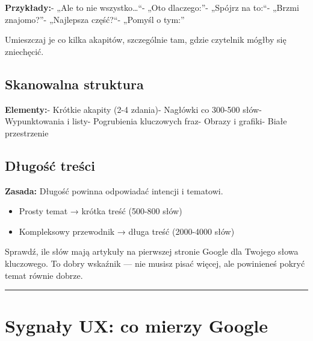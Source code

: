 \documentclass[
  12pt,
  a4paper,
  twoside,
  openright,
  12pt,
  DIV=12,
  BCOR=12mm]{scrbook}
\providecommand{\tightlist}{%
  \setlength{\itemsep}{0pt}\setlength{\parskip}{0pt}}\usepackage{longtable,booktabs,array}
\newcommand{\decoline}{%
  \begin{center}
    \textcolor{bordergray}{\rule{0.3\textwidth}{0.5pt}}
  \end{center}
}
\begin{document}
\textbf{Przykłady:}\newline - „Ale to nie wszystko\ldots{}``\newline -
„Oto dlaczego:''\newline - „Spójrz na to:``\newline - „Brzmi
znajomo?''\newline - „Najlepsza część?``\newline - „Pomyśl o tym:''

Umieszczaj je co kilka akapitów, szczególnie tam, gdzie czytelnik mógłby
się zniechęcić.

\subsection{Skanowalna struktura}\label{skanowalna-struktura}

\textbf{Elementy:}\newline - Krótkie akapity (2-4 zdania)\newline -
Nagłówki co 300-500 słów\newline - Wypunktowania i listy\newline -
Pogrubienia kluczowych fraz\newline - Obrazy i grafiki\newline - Białe
przestrzenie

\subsection{Długość treści}\label{dux142ugoux15bux107-treux15bci}

\textbf{Zasada:} Długość powinna odpowiadać intencji i tematowi.

\begin{itemize}
\tightlist
\item
  Prosty temat → krótka treść (500-800 słów)
\item
  Kompleksowy przewodnik → długa treść (2000-4000 słów)
\end{itemize}

\begin{wskazowka}
Sprawdź, ile słów mają artykuły na pierwszej stronie Google dla Twojego słowa kluczowego. To dobry wskaźnik --- nie musisz pisać więcej, ale powinieneś pokryć temat równie dobrze.
\end{wskazowka}

\decoline

\section{Sygnały UX: co mierzy
Google}\label{sygnaux142y-ux-co-mierzy-google}
\end{document}
